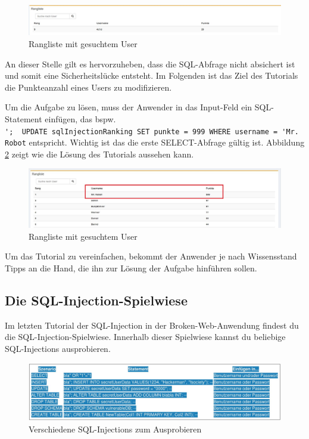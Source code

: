 \begin{figure}[H]
	\centering
	\includegraphics[width=\textwidth]{images/SQL_Injection/sql_modify_searched.jpg}
	\caption{Rangliste mit gesuchtem User}
	\label{fig:sql-modify-ranking-searched}
\end{figure}

An dieser Stelle gilt es hervorzuheben, dass die SQL-Abfrage nicht absichert ist und somit eine Sicherheitslücke entsteht. Im Folgenden ist das Ziel des Tutorials die Punkteanzahl eines Users zu modifizieren. 

Um die Aufgabe zu lösen, muss der Anwender in das Input-Feld ein SQL-Statement einfügen, das bspw. \\ \colorbox{altgray}{\lstinline|';  UPDATE sqlInjectionRanking SET punkte = 999 WHERE username = 'Mr. Robot|} entspricht. Wichtig ist das die erste SELECT-Abfrage gültig ist. Abbildung \ref{fig:sql-modify-ranking-solved} zeigt wie die Lösung des Tutorials aussehen kann. 

\begin{figure}[H]
	\centering
	\includegraphics[width=\textwidth]{images/SQL_Injection/sql_modify_solved.jpg}
	\caption{Rangliste mit gesuchtem User}
	\label{fig:sql-modify-ranking-solved}
\end{figure}

Um das Tutorial zu vereinfachen, bekommt der Anwender je nach Wissensstand Tipps an die Hand, die ihn zur Lösung der Aufgabe hinführen sollen. 


\subsection{Die SQL-Injection-Spielwiese}
Im letzten Tutorial der SQL-Injection in der Broken-Web-Anwendung findest du die SQL-Injection-Spielwiese. Innerhalb dieser Spielwiese kannst du beliebige SQL-Injections ausprobieren.

\begin{figure}[H]
	\centering
	\includegraphics[width=\textwidth]{images/SQL_Injection/various_injections.jpg}
	\caption{Verschiedene SQL-Injections zum Ausprobieren}
	\label{fig:various_injections}
\end{figure}

